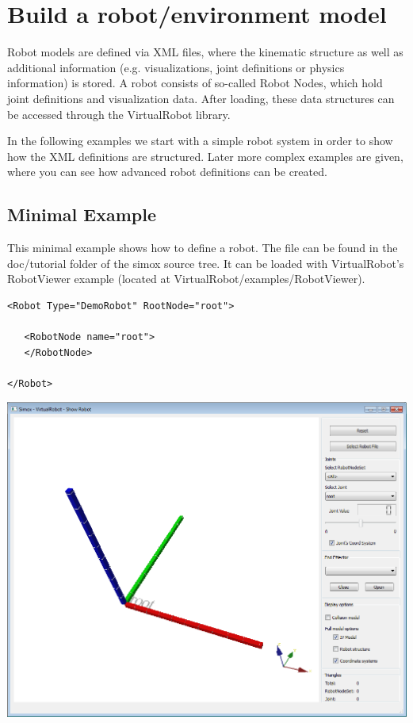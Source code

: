\section{Build a robot/environment model}
Robot models are defined via XML files, where the kinematic structure as well as additional information (e.g. visualizations, joint definitions or physics information) is stored. A robot consists of so-called Robot Nodes, which hold joint definitions and visualization data. After loading, these data structures can be accessed through the VirtualRobot library.\par In the following examples we start with a simple robot system in order to show how the XML definitions are structured. Later more complex examples are given, where you can see how advanced robot definitions can be created. \par

\subsection{Minimal Example}
\par
This minimal example shows how to define a robot. The file can be found in the doc/tutorial folder of the simox source tree. It can be loaded with VirtualRobot's RobotViewer example (located at VirtualRobot/examples/RobotViewer). 
\par
\begin{lstlisting}
<Robot Type="DemoRobot" RootNode="root">

   <RobotNode name="root">
   </RobotNode>

</Robot>
\end{lstlisting}
\includegraphics[width=\textwidth]{Tutorial1}
\par
